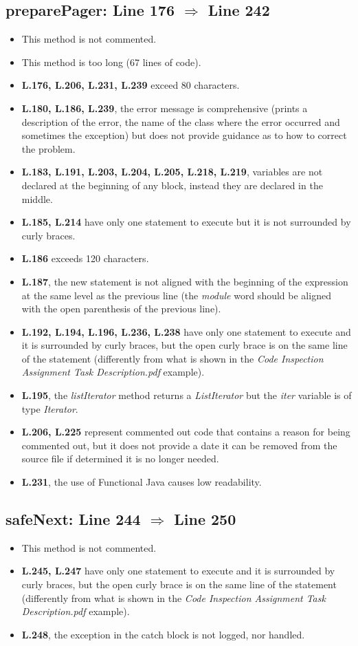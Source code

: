\subsection{preparePager: Line 176 $\Rightarrow$ Line 242}
\begin{itemize}
	\item This method is not commented.
	\item This method is too long (67 lines of code).
	\item \textbf{L.176, L.206, L.231, L.239} exceed 80 characters.
	\item \textbf{L.180, L.186, L.239}, the error message is comprehensive (prints a description of the error, the name of the class where the error occurred and sometimes the exception) but does not provide guidance as to how to correct the problem.
	\item \textbf{L.183, L.191, L.203, L.204, L.205, L.218, L.219}, variables are not declared at the beginning of any block, instead they are declared in the middle.
	\item \textbf{L.185, L.214} have only one statement to execute but it is not surrounded by curly braces.
	\item \textbf{L.186} exceeds 120 characters. 
	\item \textbf{L.187}, the new statement is not aligned with the beginning of the expression at the same level as the previous line (the \textit{module} word should be aligned with the open parenthesis of the previous line).
	\item \textbf{L.192, L.194, L.196, L.236, L.238} have only one statement to execute and it is surrounded by curly braces, but the open curly brace is on the same line of the statement (differently from what is shown in the \textit{Code Inspection Assignment Task Description.pdf} example).
	\item \textbf{L.195}, the \textit{listIterator} method returns a \textit{ListIterator} but the \textit{iter} variable is of type \textit{Iterator}.
	\item \textbf{L.206, L.225} represent commented out code that contains a reason for being commented out, but it does not provide a date it can be removed from the source file if determined it is no longer needed.
	\item \textbf{L.231}, the use of Functional Java causes low readability.
\end{itemize}

\subsection{safeNext: Line 244 $\Rightarrow$ Line 250}
\begin{itemize}
	\item This method is not commented.
	\item \textbf{L.245, L.247} have only one statement to execute and it is surrounded by curly braces, but the open curly brace is on the same line of the statement (differently from what is shown in the \textit{Code Inspection Assignment Task Description.pdf} example).
	\item \textbf{L.248}, the exception in the catch block is not logged, nor handled.
\end{itemize}

